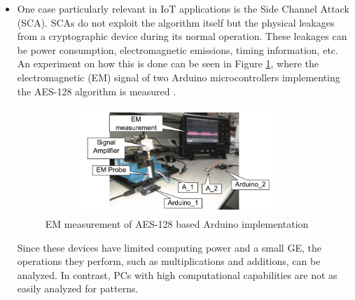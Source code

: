 \begin{itemize}
    \item One case particularly relevant in IoT applications is the Side Channel Attack (SCA). SCAs do not exploit the algorithm itself but the physical leakages from a cryptographic device during its normal operation. These leakages can be power consumption, electromagnetic emissions, timing information, etc. An experiment on how this is done can be seen in Figure \ref{fig:em_measurment}, where the electromagnetic (EM) signal of two Arduino microcontrollers implementing the AES-128 algorithm is measured \cite{pammu2016interceptive}.
    
        \begin{figure}[h]
            \centering
            \includegraphics[width=10cm, height=4cm]{media/em_measurment.png}
            \caption{EM measurement of AES-128 based Arduino implementation}
            \label{fig:em_measurment}
        \end{figure}

    Since these devices have limited computing power and a small GE, the operations they perform, such as multiplications and additions, can be analyzed. In contrast, PCs with high computational capabilities are not as easily analyzed for patterns.
    \end{itemize}



